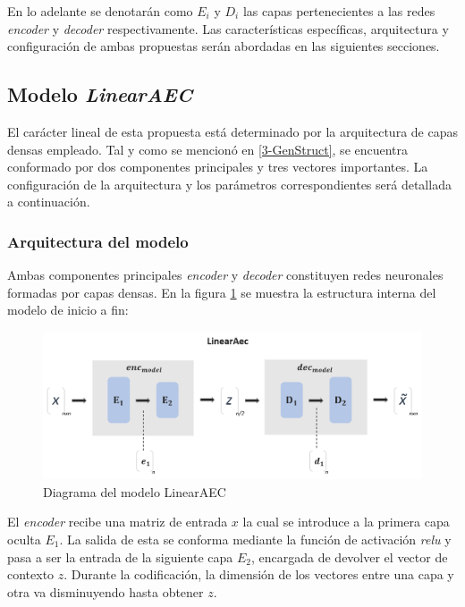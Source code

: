 En lo adelante se denotarán como $E_i$ y $D_i$ las capas pertenecientes a las redes \textit{encoder} y \textit{decoder} respectivamente. Las características específicas, arquitectura y configuración de ambas propuestas serán abordadas en las siguientes secciones.
 

\subsection{Modelo \textit{LinearAEC}}\label{LinearAEC}

El carácter lineal de esta propuesta está determinado por la arquitectura de capas densas empleado. Tal y como se mencionó en \ref{3-GenStruct}, se encuentra conformado por dos componentes principales y tres vectores importantes. La configuración de la arquitectura y los parámetros correspondientes será detallada a continuación.

\subsubsection{Arquitectura del modelo}

Ambas componentes principales \textit{encoder} y \textit{decoder} constituyen redes neuronales formadas por capas densas. En la figura \ref{AECmodel} se muestra la estructura interna del modelo de inicio a fin:\\

\newpage

\begin{figure}[!h]
\centering
\includegraphics[width=5in]{Graphics/Aecmodel.png}

\caption{ \small{Diagrama del modelo LinearAEC}}

\label{AECmodel}
\end{figure}  


El \textit{encoder} recibe una matriz de entrada $x$ la cual se introduce a la primera capa oculta $E_1$. La salida de esta se conforma mediante la función de activación \textit{relu} y pasa a ser la entrada de la siguiente capa $E_2$, encargada de devolver el vector de contexto $z$. Durante la codificación, la dimensión de los vectores entre una capa y otra va disminuyendo hasta obtener $z$.

